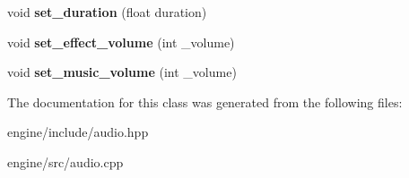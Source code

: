 \begin{DoxyCompactItemize}
\item 
void {\bfseries set\+\_\+duration} (float duration)\hypertarget{classengine_1_1_audio_a911a2913f86b8e09485662613d9c34a7}{}\label{classengine_1_1_audio_a911a2913f86b8e09485662613d9c34a7}

\item 
void {\bfseries set\+\_\+effect\+\_\+volume} (int \+\_\+volume)\hypertarget{classengine_1_1_audio_a05a6030343dc02aedff9efd8030276fc}{}\label{classengine_1_1_audio_a05a6030343dc02aedff9efd8030276fc}

\item 
void {\bfseries set\+\_\+music\+\_\+volume} (int \+\_\+volume)\hypertarget{classengine_1_1_audio_aa44f63fae08d1cf93ca787a05d29ab5f}{}\label{classengine_1_1_audio_aa44f63fae08d1cf93ca787a05d29ab5f}

\end{DoxyCompactItemize}


The documentation for this class was generated from the following files\+:\begin{DoxyCompactItemize}
\item 
engine/include/audio.\+hpp\item 
engine/src/audio.\+cpp\end{DoxyCompactItemize}
